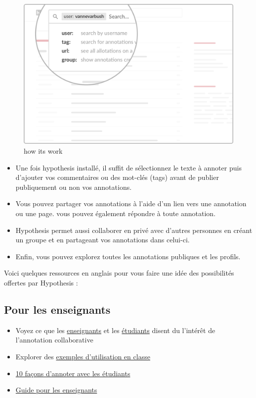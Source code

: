 \documentclass[
]{book}
\providecommand{\tightlist}{%
  \setlength{\itemsep}{0pt}\setlength{\parskip}{0pt}}
\begin{document}
\begin{figure}
\centering
\includegraphics{img/05@2x.png}
\caption{how its work}
\end{figure}

\begin{itemize}
\tightlist
\item
  Une fois hypothesis installé, il suffit de sélectionnez le texte à annoter puis d'ajouter vos commentaires ou des mot-clés (tags) avant de publier publiquement ou non vos annotations.
\item
  Vous pouvez partager vos annotations à l'aide d'un lien vers une annotation ou une page. vous pouvez également répondre à toute annotation.
\item
  Hypothesis permet aussi collaborer en privé avec d'autres personnes en créant un groupe et en partageant vos annotations dans celui-ci.
\item
  Enfin, vous pouvez explorez toutes les annotations publiques et les profils.
\end{itemize}

Voici quelques ressources en anglais pour vous faire une idée des possibilités offertes par Hypothesis :

\hypertarget{pour-les-enseignants}{%
\subsection*{Pour les enseignants}\label{pour-les-enseignants}}

\begin{itemize}
\tightlist
\item
  Voyez ce que les \href{https://web.hypothes.is/teacher-testimonials/}{enseignants} et les \href{https://web.hypothes.is/student-testimonials/}{étudiants} disent du l'intérêt de l'annotation collaborative
\item
  Explorer des \href{https://web.hypothes.is/examples-of-classroom-use/}{exemples d'utilisation en classe}
\item
  \href{https://web.hypothes.is/blog/back-to-school-with-annotation-10-ways-to-annotate-with-students/}{10 façons d'annoter avec les étudiants}
\item
  \href{https://web.hypothes.is/teacher-resource-guide/}{Guide pour les enseignants}
\end{itemize}
\end{document}
